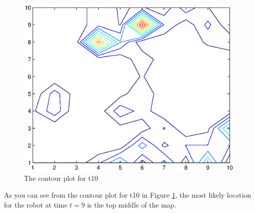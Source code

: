 \documentclass[11pt,a4paper]{article}
\begin{document}
\begin{enumerate}
		\begin{figure}[H!]
			\label{contour10}
			\begin{center}
				\includegraphics[scale=0.75]{t10-contour.eps}
			\end{center}
			\caption{The contour plot for t10}
		\end{figure}
		As you can see from the contour plot for t10 in Figure \ref{contour10}, the most
		likely location for the robot at time $t=9$ is the top middle of the map.
		

\end{enumerate}
\end{document}
